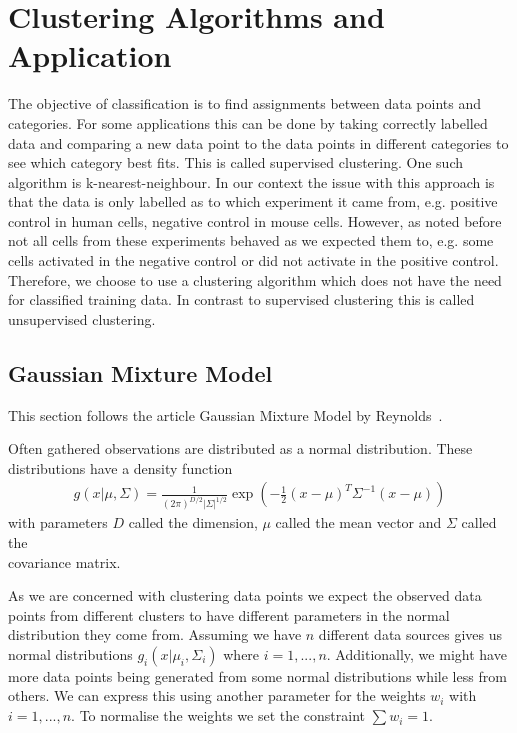\chapter{Clustering Algorithms and Application}
\label{chapter:clustering}

The objective of classification is to find assignments between data points and categories. For some applications this can be done by taking correctly labelled data and comparing a new data point to the data points in different categories to see which category best fits. This is called supervised clustering. One such algorithm is k-nearest-neighbour. In our context the issue with this approach is that the data is only labelled as to which experiment it came from, e.g. positive control in human cells, negative control in mouse cells. However, as noted before not all cells from these experiments behaved as we expected them to, e.g. some cells activated in the negative control or did not activate in the positive control. Therefore, we choose to use a clustering algorithm which does not have the need for classified training data. In contrast to supervised clustering this is called unsupervised clustering.

\section{Gaussian Mixture Model}
\label{sec:gaussian_mixture_model}

This section follows the article Gaussian Mixture Model by Reynolds~\cite{reynolds2009}.

Often gathered observations are distributed as a normal distribution. These distributions have a density function
\begin{align*}
	g(x|\mu, \Sigma) = \frac{1}{(2\pi)^{D/2} |\Sigma|^{1/2}} \exp\left( - \frac{1}{2} (x-\mu)^T \Sigma^{-1} (x-\mu) \right)
\end{align*}
with parameters $D$ called the dimension, $\mu$ called the mean vector and $\Sigma$ called the\\ covariance matrix.

As we are concerned with clustering data points we expect the observed data points from different clusters to have different parameters in the normal distribution they come from. Assuming we have $n$ different data sources gives us normal distributions $g_i(x|\mu_i, \Sigma_i)$ where $i=1, ..., n$. Additionally, we might have more data points being generated from some normal distributions while less from others. We can express this using another parameter for the weights $w_i$ with $i=1, ..., n$. To normalise the weights we set the constraint $\sum w_i = 1$.

